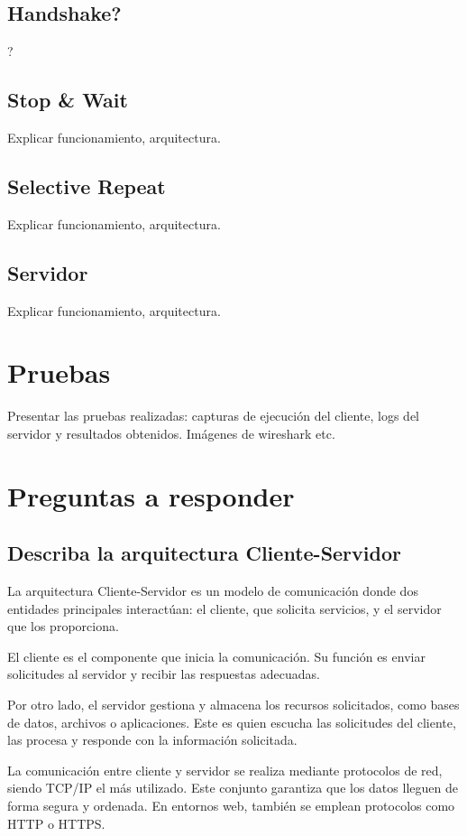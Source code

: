 \documentclass[a4paper,10pt]{article}
\begin{document}
\subsection{Handshake?}
?

\subsection{Stop \& Wait}
Explicar funcionamiento, arquitectura.

\subsection{Selective Repeat}
Explicar funcionamiento, arquitectura.

\subsection{Servidor}
Explicar funcionamiento, arquitectura.

\section{Pruebas}
Presentar las pruebas realizadas: capturas de ejecución del cliente, logs del servidor y resultados obtenidos. Imágenes de wireshark etc.

\section{Preguntas a responder}
\subsection{Describa la arquitectura Cliente-Servidor}
La arquitectura Cliente-Servidor es un modelo de comunicación donde dos entidades principales interactúan: el cliente, que solicita servicios, y el servidor que los proporciona.

El cliente es el componente que inicia la comunicación. Su función es enviar solicitudes al servidor y recibir las respuestas adecuadas.

Por otro lado, el servidor gestiona y almacena los recursos solicitados, como bases de datos, archivos o aplicaciones. Este es quien escucha las solicitudes del cliente, las procesa y responde con la información solicitada.

La comunicación entre cliente y servidor se realiza mediante protocolos de red, siendo TCP/IP el más utilizado. Este conjunto garantiza que los datos lleguen de forma segura y ordenada. En entornos web, también se emplean protocolos como HTTP o HTTPS.
\end{document}
